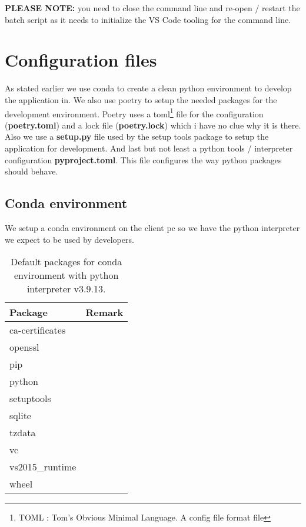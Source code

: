 \begin{Remark}
	\item \textbf{PLEASE NOTE:} you need to close the command line and re-open / restart the batch script as it needs to initialize the VS Code tooling for the command line.
\end{Remark}


\section{Configuration files}
As stated earlier we use conda to create a clean python environment to develop the \dfastmi application in. We also use poetry to setup the needed packages for the development environment. Poetry uses a toml\footnote{TOML : Tom's Obvious Minimal Language. A config file format file} file for the configuration (\textbf{poetry.toml}) and a lock file (\textbf{poetry.lock}) which i have no clue why it is there. Also we use a \textbf{setup.py} file used by the setup tools package to setup the application for development. And last but not least a python tools / interpreter configuration \textbf{pyproject.toml}. This file configures the way python packages should behave.

\subsection{Conda environment}
We setup a conda environment on the client pc so we have the python interpreter we expect to be used by developers.
\begin{table}[]
	\caption{Default packages for conda environment with python interpreter v3.9.13.}
	\begin{tabular}{|l|l|}
		\hline
		\textbf{Package}    & \textbf{Remark} \\ \hline
		ca-certificates     &                 \\ \hline
		openssl             &                 \\ \hline
		pip                 &                 \\ \hline
		python              &                 \\ \hline
		setuptools          &                 \\ \hline
		sqlite              &                 \\ \hline
		tzdata              &                 \\ \hline
		vc                  &                 \\ \hline
		vs2015\_runtime     &                 \\ \hline
		wheel               &                 \\ \hline
	\end{tabular}
\end{table}

